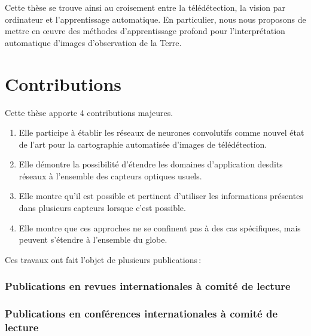 Cette thèse se trouve ainsi au croisement entre la télédétection, la vision par ordinateur et l'apprentissage automatique. En particulier, nous nous proposons de mettre en \oe{}uvre des méthodes d'apprentissage profond pour l'interprétation automatique d'images d'observation de la Terre.

\section{Contributions}

Cette thèse apporte 4 contributions majeures.
\begin{enumerate}
  \item Elle participe à établir les réseaux de neurones convolutifs comme nouvel état de l'art pour la cartographie automatisée d'images de télédétection.
  \item Elle démontre la possibilité d'étendre les domaines d'application desdits réseaux à l'ensemble des capteurs optiques usuels.
  \item Elle montre qu'il est possible et pertinent d'utiliser les informations présentes dans plusieurs capteurs lorsque c'est possible.
  \item Elle montre que ces approches ne se confinent pas à des cas spécifiques, mais peuvent s'étendre à l'ensemble du globe.
\end{enumerate}

Ces travaux ont fait l'objet de plusieurs publications\,:

\subsubsection*{Publications en revues internationales à comité de lecture}



\subsubsection*{Publications en conférences internationales à comité de lecture}






